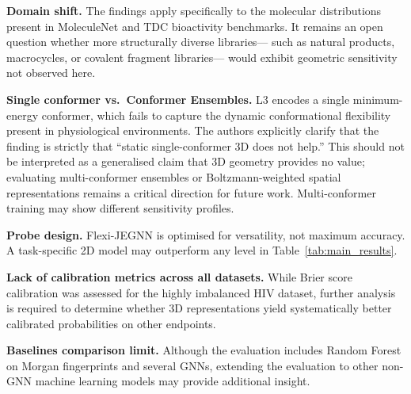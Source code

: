 \documentclass[pdflatex,sn-vancouver-num]{sn-jnl}%
\theoremstyle{thmstyleone}%
\theoremstyle{thmstyletwo}%
\theoremstyle{thmstylethree}%
\begin{document}
\textbf{Domain shift.}  The findings apply specifically to the molecular
distributions present in MoleculeNet and TDC bioactivity benchmarks.
It remains an open question whether more structurally diverse libraries---
such as natural products, macrocycles, or covalent fragment libraries---
would exhibit geometric sensitivity not observed here.


\textbf{Single conformer vs.\ Conformer Ensembles.}  L3 encodes a single
minimum-energy conformer, which fails to capture the dynamic conformational
flexibility present in physiological environments. The authors explicitly clarify that the finding is strictly that ``static single-conformer 3D does not help.'' This should not be interpreted as a generalised claim that 3D geometry provides no value; evaluating multi-conformer ensembles or Boltzmann-weighted spatial
representations remains a critical direction for future work.
Multi-conformer training \cite{stark2022infomax} may show different
sensitivity profiles.

\textbf{Probe design.}  Flexi-JEGNN is optimised for versatility, not
maximum accuracy.  A task-specific 2D model may outperform any level in
Table~\ref{tab:main_results}.

\textbf{Lack of calibration metrics across all datasets.} While Brier score calibration was assessed for the highly imbalanced HIV dataset, further analysis is required to determine whether 3D representations yield systematically better calibrated probabilities on other endpoints.

\textbf{Baselines comparison limit.} Although the evaluation includes Random Forest on Morgan fingerprints and several GNNs, extending the evaluation to other non-GNN machine learning models may provide additional insight.
\end{document}
